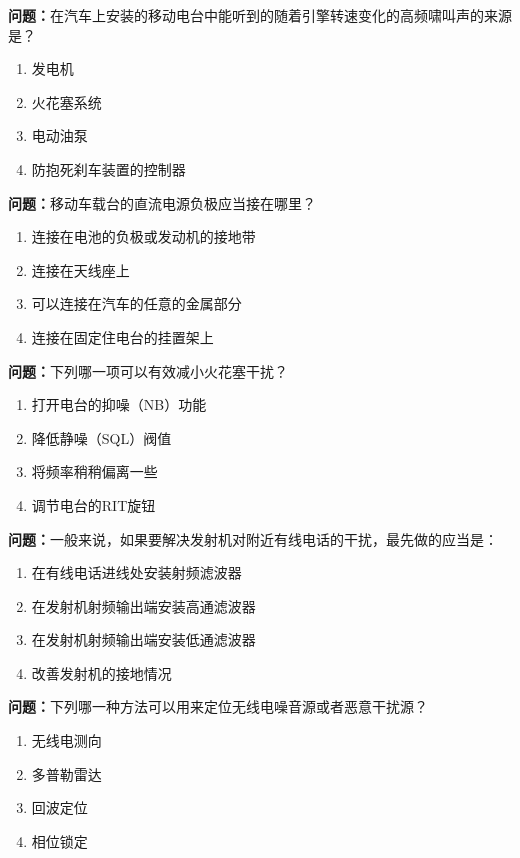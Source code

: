\noindent\textbf{问题：}在汽车上安装的移动电台中能听到的随着引擎转速变化的高频啸叫声的来源是？
\begin{enumerate}[label=\Alph*), leftmargin=3em]
\item 发电机
\item 火花塞系统
\item 电动油泵
\item 防抱死刹车装置的控制器
\end{enumerate}

\bigskip


\noindent\textbf{问题：}移动车载台的直流电源负极应当接在哪里？
\begin{enumerate}[label=\Alph*), leftmargin=3em]
\item 连接在电池的负极或发动机的接地带
\item 连接在天线座上
\item 可以连接在汽车的任意的金属部分
\item 连接在固定住电台的挂置架上
\end{enumerate}

\bigskip


\noindent\textbf{问题：}下列哪一项可以有效减小火花塞干扰？
\begin{enumerate}[label=\Alph*), leftmargin=3em]
\item 打开电台的抑噪（NB）功能
\item 降低静噪（SQL）阀值
\item 将频率稍稍偏离一些
\item 调节电台的RIT旋钮
\end{enumerate}

\bigskip


\noindent\textbf{问题：}一般来说，如果要解决发射机对附近有线电话的干扰，最先做的应当是：
\begin{enumerate}[label=\Alph*), leftmargin=3em]
\item 在有线电话进线处安装射频滤波器
\item 在发射机射频输出端安装高通滤波器
\item 在发射机射频输出端安装低通滤波器
\item 改善发射机的接地情况
\end{enumerate}

\bigskip


\noindent\textbf{问题：}下列哪一种方法可以用来定位无线电噪音源或者恶意干扰源？
\begin{enumerate}[label=\Alph*), leftmargin=3em]
\item 无线电测向
\item 多普勒雷达
\item 回波定位
\item 相位锁定
\end{enumerate}



